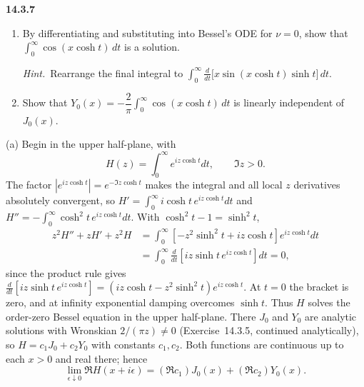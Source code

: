 \par\bigskip
\noindent\textbf{14.3.7}
\begin{enumerate}
\item[(a)] By differentiating and substituting into Bessel's ODE for
$\nu=0$, show that $\displaystyle\int_{0}^{\infty}\cos(x\cosh t)\,dt$
is a solution.
\par\emph{Hint.}~Rearrange the final integral to
$\displaystyle\int_{0}^{\infty}\frac{d}{dt}
\big[x\sin(x\cosh t)\sinh t\big]\,dt$.
\item[(b)] Show that
$Y_{0}(x)=-\dfrac{2}{\pi}\displaystyle\int_{0}^{\infty}
\cos(x\cosh t)\,dt$ is linearly independent of $J_{0}(x)$.
\end{enumerate}
\par{}
\solution
{}

(a) Begin in the upper half-plane, with
\[
H(z)=\int_0^\infty e^{iz\cosh t}dt,\qquad\Im z>0.
\]
The factor $|e^{iz\cosh t}|=e^{-\Im z\cosh t}$ makes the integral
and all local $z$ derivatives absolutely convergent, so
$H'=\int_0^\infty i\cosh t\,e^{iz\cosh t}dt$ and
$H''=-\int_0^\infty\cosh^2t\,e^{iz\cosh t}dt$. With
$\cosh^2t-1=\sinh^2t$,
\begin{align*}
z^2H''+zH'+z^2H
&=\int_0^\infty[-z^2\sinh^2t+iz\cosh t]e^{iz\cosh t}dt\\
&=\int_0^\infty\frac d{dt}
\left[iz\sinh t\,e^{iz\cosh t}\right]dt=0,
\end{align*}
since the product rule gives
$\frac d{dt}[iz\sinh t\,e^{iz\cosh t}]
=(iz\cosh t-z^2\sinh^2t)e^{iz\cosh t}$.
At $t=0$ the bracket is zero, and at infinity exponential damping
overcomes $\sinh t$. Thus $H$ solves the order-zero Bessel equation
in the upper half-plane. There $J_0$ and $Y_0$ are analytic
solutions with Wronskian $2/(\pi z)\ne0$ (Exercise~14.3.5, continued
analytically), so $H=c_1J_0+c_2Y_0$ with constants $c_1,c_2$. Both
functions are continuous up to each $x>0$ and real there; hence
\[
\lim_{\epsilon\downarrow0}\Re H(x+i\epsilon)
=(\Re c_1)J_0(x)+(\Re c_2)Y_0(x).
\]


